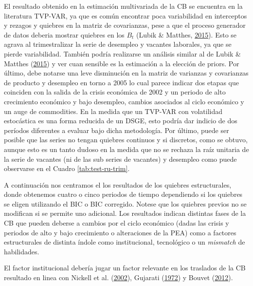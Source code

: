 \documentclass[12pt,oneside]{reedthesis}
\begin{document}
El resultado obtenido en la estimación multivariada de la CB se encuentra en la literatura TVP-VAR, ya que es común encontrar poca variabilidad en interceptos y rezagos y quiebres en la matriz de covarianzas, pese a que el proceso generador de datos deberia mostrar quiebres en los \(B_t\) (Lubik \& Matthes, \protect\hyperlink{ref-Lubik2016b}{2015}). Esto se agrava al trimestralizar la serie de desempleo y vacantes laborales, ya que se pierde variabilidad. También podría realizarse un análisis similar al de Lubik \& Matthes (\protect\hyperlink{ref-Lubik2016b}{2015}) y ver cuan sensible es la estimación a la elección de priors. Por último, debe notarse una leve disminución en la matriz de varianzas y covarianzas de producto y desempleo en torno a 2005 lo cual parece indicar dos etapas que coinciden con la salida de la crisis económica de 2002 y un periodo de alto crecimiento económico y bajo desempleo, cambios asociados al ciclo económico y un auge de commodities. En la medida que un TVP-VAR con volatilidad estocástica es una forma reducida de un DSGE, esto podría dar indicio de dos períodos diferentes a evaluar bajo dicha metodología. Por último, puede ser posible que las series no tengan quiebres continuos y si discretos, como se obtuvo, aunque esto es un tanto dudoso en la medida que no se rechaza la raíz unitaria de la serie de vacantes (ni de las sub series de vacantes) y desempleo como puede observarse en el Cuadro \ref{tab:test-ru-trim}.

A continuación nos centramos el los resultados de los quiebres estructurales, donde obtenemos cuatro o cinco periodos de tiempo dependiendo si los quiebres se eligen utilizando el BIC o BIC corregido. Notese que los quiebres previos no se modifican si se permite uno adicional. Los resultados indican distintas fases de la CB que pueden deberse a cambios por el ciclo económico (dadas las crisis y periodos de alto y bajo crecimiento o alteraciones de la PEA) como a factores estructurales de distinta índole como institucional, tecnológico o un \emph{mismatch} de habilidades.

El factor institucional debería jugar un factor relevante en los traslados de la CB resultado en linea con Nickell et al. (\protect\hyperlink{ref-Nickell2002}{2002}), Gujarati (\protect\hyperlink{ref-Gujarati1972}{1972}) y Bouvet (\protect\hyperlink{ref-Bouvet2012}{2012}).
\end{document}
